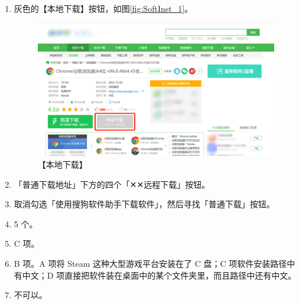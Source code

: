 \begin{enumerate}
  \item 灰色的【本地下载】按钮，如图\autoref{fig:SoftInst_1}。
    \begin{figure}[htb!]
      \centering
      \includegraphics[width=.8\textwidth]{assets/appendix/SoftInst_1.png}
      \caption{【本地下载】}
      \label{fig:SoftInst_1}
    \end{figure}
  \item 「普通下载地址」下方的四个「✕✕远程下载」按钮。
  \item 取消勾选「使用搜狗软件助手下载软件」，然后寻找「普通下载」按钮。
  \item 5 个。
  \item C 项。
  \item B 项。A 项将 Steam 这种大型游戏平台安装在了 C 盘；C 项软件安装路径中有中文；D 项直接把软件装在桌面中的某个文件夹里，而且路径中还有中文。
  \item 不可以。
\end{enumerate}

\section{}

